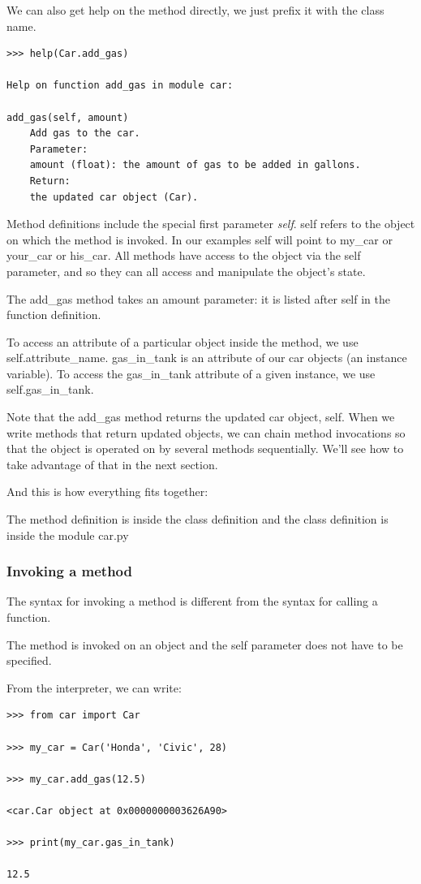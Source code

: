 \documentclass{article}
\begin{document}
We can also get help on the method directly, we just prefix it with the class name.

\begin{lstlisting}
>>> help(Car.add_gas)

Help on function add_gas in module car:
 
add_gas(self, amount)
    Add gas to the car.
    Parameter:
    amount (float): the amount of gas to be added in gallons.
    Return:
    the updated car object (Car).
\end{lstlisting}

Method definitions include the special first parameter \textit{self}.  self refers to the object on which the method is invoked. In our examples self will point to my{\_}car or your{\_}car or his{\_}car.  All methods have access to the object via the self parameter, and so they can all access and manipulate the object's state.

The add{\_}gas method takes an amount parameter:  it is listed after self in the function definition.

To access an attribute of a particular object inside the method, we use self.attribute{\_}name.  gas{\_}in{\_}tank is an attribute of our car objects (an instance variable).  To access the gas{\_}in{\_}tank attribute of a given instance, we use self.gas{\_}in{\_}tank.

Note that the add{\_}gas method returns the updated car object, self. When we write methods that return updated objects, we can chain method invocations so that the object is operated on by several methods sequentially.  We'll see how to take advantage of that in the next section.

And this is how everything fits together:

The method definition is inside the class definition and the class definition is inside the module car.py

\subsubsection{Invoking a method}
The syntax for invoking a method is different from the syntax for calling a function. 

The method is invoked on an object and the self parameter does not have to be specified.

From the interpreter, we can write:

\begin{lstlisting}
>>> from car import Car

>>> my_car = Car('Honda', 'Civic', 28)

>>> my_car.add_gas(12.5)

<car.Car object at 0x0000000003626A90>

>>> print(my_car.gas_in_tank)

12.5
\end{lstlisting}
\end{document}
